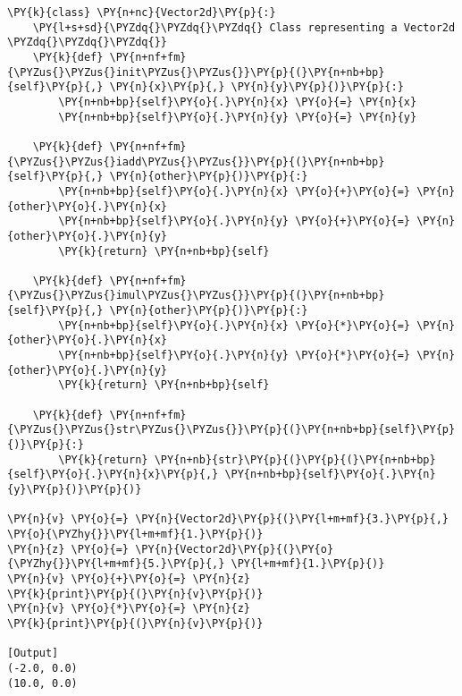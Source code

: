 \begin{Verbatim}[label=\makebox{\url{https://bitbucket.org/lbaldini/programming/src/tip/snippets/vector2d\_5.py}},commandchars=\\\{\}]
\PY{k}{class} \PY{n+nc}{Vector2d}\PY{p}{:}
    \PY{l+s+sd}{\PYZdq{}\PYZdq{}\PYZdq{} Class representing a Vector2d \PYZdq{}\PYZdq{}\PYZdq{}}   
    \PY{k}{def} \PY{n+nf+fm}{\PYZus{}\PYZus{}init\PYZus{}\PYZus{}}\PY{p}{(}\PY{n+nb+bp}{self}\PY{p}{,} \PY{n}{x}\PY{p}{,} \PY{n}{y}\PY{p}{)}\PY{p}{:}
        \PY{n+nb+bp}{self}\PY{o}{.}\PY{n}{x} \PY{o}{=} \PY{n}{x}
        \PY{n+nb+bp}{self}\PY{o}{.}\PY{n}{y} \PY{o}{=} \PY{n}{y}
    
    \PY{k}{def} \PY{n+nf+fm}{\PYZus{}\PYZus{}iadd\PYZus{}\PYZus{}}\PY{p}{(}\PY{n+nb+bp}{self}\PY{p}{,} \PY{n}{other}\PY{p}{)}\PY{p}{:}
        \PY{n+nb+bp}{self}\PY{o}{.}\PY{n}{x} \PY{o}{+}\PY{o}{=} \PY{n}{other}\PY{o}{.}\PY{n}{x}
        \PY{n+nb+bp}{self}\PY{o}{.}\PY{n}{y} \PY{o}{+}\PY{o}{=} \PY{n}{other}\PY{o}{.}\PY{n}{y}
        \PY{k}{return} \PY{n+nb+bp}{self}
        
    \PY{k}{def} \PY{n+nf+fm}{\PYZus{}\PYZus{}imul\PYZus{}\PYZus{}}\PY{p}{(}\PY{n+nb+bp}{self}\PY{p}{,} \PY{n}{other}\PY{p}{)}\PY{p}{:}
        \PY{n+nb+bp}{self}\PY{o}{.}\PY{n}{x} \PY{o}{*}\PY{o}{=} \PY{n}{other}\PY{o}{.}\PY{n}{x}
        \PY{n+nb+bp}{self}\PY{o}{.}\PY{n}{y} \PY{o}{*}\PY{o}{=} \PY{n}{other}\PY{o}{.}\PY{n}{y}
        \PY{k}{return} \PY{n+nb+bp}{self}
        
    \PY{k}{def} \PY{n+nf+fm}{\PYZus{}\PYZus{}str\PYZus{}\PYZus{}}\PY{p}{(}\PY{n+nb+bp}{self}\PY{p}{)}\PY{p}{:}
        \PY{k}{return} \PY{n+nb}{str}\PY{p}{(}\PY{p}{(}\PY{n+nb+bp}{self}\PY{o}{.}\PY{n}{x}\PY{p}{,} \PY{n+nb+bp}{self}\PY{o}{.}\PY{n}{y}\PY{p}{)}\PY{p}{)}
     
\PY{n}{v} \PY{o}{=} \PY{n}{Vector2d}\PY{p}{(}\PY{l+m+mf}{3.}\PY{p}{,} \PY{o}{\PYZhy{}}\PY{l+m+mf}{1.}\PY{p}{)}
\PY{n}{z} \PY{o}{=} \PY{n}{Vector2d}\PY{p}{(}\PY{o}{\PYZhy{}}\PY{l+m+mf}{5.}\PY{p}{,} \PY{l+m+mf}{1.}\PY{p}{)}
\PY{n}{v} \PY{o}{+}\PY{o}{=} \PY{n}{z}
\PY{k}{print}\PY{p}{(}\PY{n}{v}\PY{p}{)}
\PY{n}{v} \PY{o}{*}\PY{o}{=} \PY{n}{z}
\PY{k}{print}\PY{p}{(}\PY{n}{v}\PY{p}{)}

[Output]
(-2.0, 0.0)
(10.0, 0.0)
\end{Verbatim}